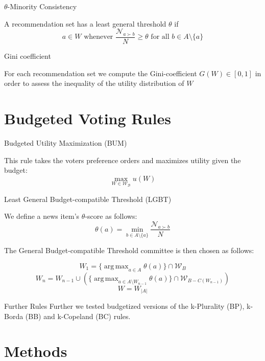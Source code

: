 \documentclass{beamer}
\DeclareMathOperator*{\argmax}{arg\,max}
\begin{document}
\begin{frame}{$\theta$-Minority Consistency}
	
A recommendation set has a least general threshold $\theta$ if \[a\in W\text{ whenever }\frac {\mathcal{N}_{a\succ b}}{N}\geq \theta \text{ for all } b\in A\setminus \{a\} \]
	
\end{frame}

\begin{frame}{Gini coefficient}

	For each recommendation set we compute the Gini-coefficient $G(W) \in [0,1]$ in order to assess the inequality of the utility distribution of $W$


\end{frame}

\section{Budgeted Voting Rules}

\begin{frame}{Budgeted Utility Maximization (BUM)}

This rule takes the voters preference orders and maximizes utility given the budget:
\[
\max_{W\in\mathcal{ W_B}} u(W)
	\]
	
\end{frame}

\begin{frame}{Least General Budget-compatible Threshold (LGBT)}
	
We define a news item's $\theta$-score as follows: \[\theta(a)=\min_{b\in A \setminus {\{a\}}} \frac{\mathcal{N}_{a\succ b}}{N}\]

The General Budget-compatible Threshold committee is then chosen as follows:

\[W_1=\{\argmax_{a\in A}\theta(a)\}\cap \mathcal{W}_B\]
\[W_n=W_{n-1}\cup (\{\argmax_{a\in A\setminus W_{n-1}}\theta (a)\}\cap \mathcal{W}_{B-C(W_{n-1})})\]
\[W=W_{|A|}\]

\end{frame}

\begin{frame}{Further Rules}
	Further we tested budgetized versions of the k-Plurality (BP), k-Borda (BB) and k-Copeland (BC) rules. 
\end{frame}

\section{Methods}
\end{document}
